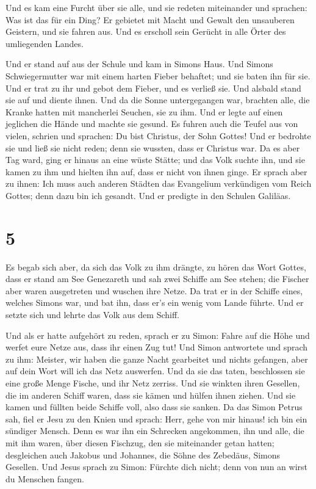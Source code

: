  Und es kam eine Furcht über sie alle, und sie redeten
miteinander und sprachen: Was ist das für ein Ding? Er gebietet mit
Macht und Gewalt den unsauberen Geistern, und sie fahren aus.
 Und es erscholl sein Gerücht in alle Örter des
umliegenden Landes.

 Und er stand auf aus der Schule und kam in Simons Haus.
Und Simons Schwiegermutter war mit einem harten Fieber behaftet; und sie
baten ihn für sie.  Und er trat zu ihr und gebot dem
Fieber, und es verließ sie. Und alsbald stand sie auf und diente ihnen.
 Und da die Sonne untergegangen war, brachten alle, die
Kranke hatten mit mancherlei Seuchen, sie zu ihm. Und er legte auf einen
jeglichen die Hände und machte sie gesund.  Es fuhren
auch die Teufel aus von vielen, schrien und sprachen: Du bist Christus,
der Sohn Gottes! Und er bedrohte sie und ließ sie nicht reden; denn sie
wussten, dass er Christus war.  Da es aber Tag ward, ging
er hinaus an eine wüste Stätte; und das Volk suchte ihn, und sie kamen
zu ihm und hielten ihn auf, dass er nicht von ihnen ginge.
 Er sprach aber zu ihnen: Ich muss auch anderen Städten
das Evangelium verkündigen vom Reich Gottes; denn dazu bin ich gesandt.
 Und er predigte in den Schulen Galiläas.

\hypertarget{section-4}{%
\section{5}\label{section-4}}

 Es begab sich aber, da sich das Volk zu ihm drängte, zu
hören das Wort Gottes, dass er stand am See Genezareth 
und sah zwei Schiffe am See stehen; die Fischer aber waren ausgetreten
und wuschen ihre Netze.  Da trat er in der Schiffe eines,
welches Simons war, und bat ihn, dass er's ein wenig vom Lande führte.
Und er setzte sich und lehrte das Volk aus dem Schiff.

 Und als er hatte aufgehört zu reden, sprach er zu Simon:
Fahre auf die Höhe und werfet eure Netze aus, dass ihr einen Zug tut!
 Und Simon antwortete und sprach zu ihm: Meister, wir
haben die ganze Nacht gearbeitet und nichts gefangen, aber auf dein Wort
will ich das Netz auswerfen.  Und da sie das taten,
beschlossen sie eine große Menge Fische, und ihr Netz zerriss.
 Und sie winkten ihren Gesellen, die im anderen Schiff
waren, dass sie kämen und hülfen ihnen ziehen. Und sie kamen und füllten
beide Schiffe voll, also dass sie sanken.  Da das Simon
Petrus sah, fiel er Jesu zu den Knien und sprach: Herr, gehe von mir
hinaus! ich bin ein sündiger Mensch.  Denn es war ihn ein
Schrecken angekommen, ihn und alle, die mit ihm waren, über diesen
Fischzug, den sie miteinander getan hatten;  desgleichen
auch Jakobus und Johannes, die Söhne des Zebedäus, Simons Gesellen. Und
Jesus sprach zu Simon: Fürchte dich nicht; denn von nun an wirst du
Menschen fangen.

